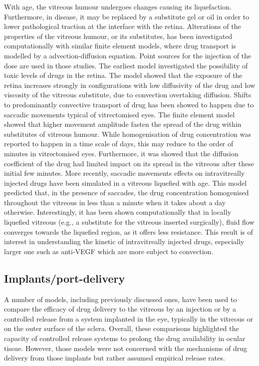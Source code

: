 \documentclass[12pt,a4paper]{journal}
\begin{document}
With age, the vitreous humour undergoes changes causing its liquefaction.
Furthermore, in disease, it may be replaced by a substitute gel or oil in order to lower pathological traction at the interface with the retina.
Alterations of the properties of the vitreous humour, or its substitutes, has been investigated computationally with similar finite element models, where drug transport is modelled by a advection-diffusion equation.\cite{Kathawate_2008,Modareszadeh_2012}
Point sources for the injection of the dose are used in those studies.
The earliest model investigated the possibility of toxic levels of drugs in the retina.\cite{Kathawate_2008}
The model showed that the exposure of the retina increases strongly in configurations with low diffusivity of the drug and low viscosity of the vitreous substitute, due to convection overtaking diffusion.\cite{Kathawate_2008}
Shifts to predominantly convective transport of drug has been showed to happen due to saccadic movements typical of vitrectomised eyes.\cite{Modareszadeh_2012}
The finite element model showed that higher movement amplitude fasten the spread of the drug within substitutes of vitreous humour.
While homogenisation of drug concentration was reported to happen in a time scale of days, this may reduce to the order of minutes in vitrectomised eyes.\cite{Modareszadeh_2012}
Furthermore, it was showed that the diffusion coefficient of the drug had limited impact on its spread in the vitreous after these initial few minutes.\cite{Modareszadeh_2012}
More recently, saccadic movements effects on intravitreally injected drugs have been simulated in a vitreous liquefied with age.\cite{Ferroni_2020}
This model predicted that, in the presence of saccades, the drug concentration homogenised throughout the vitreous in less than a minute when it takes about a day otherwise.
Interestingly, it has been shown computationally that in locally liquefied vitreous (e.g., a substitute for the vitreous inserted surgically), fluid flow converges towards the liquefied region, as it offers less resistance.\cite{Khoobyar_2022}
This result is of interest in understanding the kinetic of intravitreally injected drugs, especially larger one such as anti-VEGF which are more subject to convection.

\subsection*{Implants/port-delivery}

A number of models, including previously discussed ones, have been used to compare the efficacy of drug delivery to the vitreous by an injection or by a controlled release from a system implanted in the eye, typically in the vitreous or on the outer surface of the sclera.\cite{Jooybar_2014,Kathawate_2008,Kavousanakis_2014,Park_2005}
Overall, these comparisons highlighted the capacity of controlled release systems to prolong the drug availability in ocular tissue.
However, those models were not concerned with the mechanisms of drug delivery from those implants but rather assumed empirical release rates.
\end{document}
